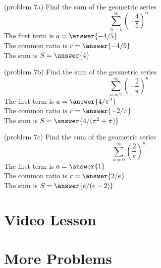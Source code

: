 \documentclass{ximera}
\begin{document}
\begin{problem}(problem 7a)
Find the sum of the geometric series 
\[
\sum_{n=1}^\infty \left(-\frac45\right)^n
\]
The first term is $a = \answer{-4/5}$\\
The common ratio is $r = \answer{-4/9}$\\
The sum is $S= \answer{4}$

\end{problem}


\begin{problem}(problem 7b)
Find the sum of the geometric series 
\[
\sum_{n=2}^\infty \left(-\frac{2}{\pi}\right)^n
\]
The first term is $a = \answer{4/\pi^2}$\\
The common ratio is $r = \answer{-2/\pi}$\\
The sum is $S= \answer{4/(\pi^2 + \pi)}$

\end{problem}

\begin{problem}(problem 7c)
Find the sum of the geometric series 
\[
\sum_{n=0}^\infty \left(\frac{2}{e}\right)^n
\]
The first term is $a = \answer{1}$\\
The common ratio is $r = \answer{2/e}$\\
The sum is $S= \answer{e/(e-2)}$

\end{problem}

\section{Video Lesson}


\begin{center}
\begin{foldable}
\end{foldable}
\end{center}


\section{More Problems}
\end{document}
